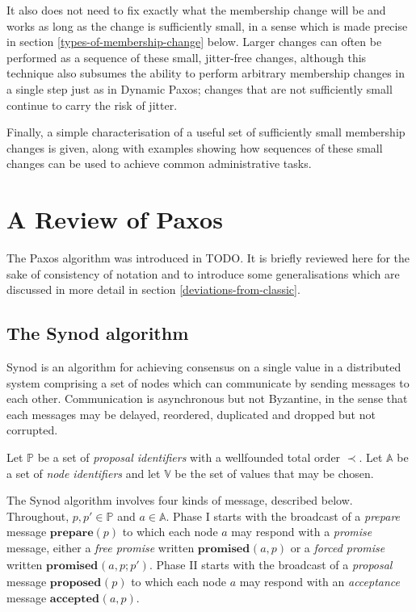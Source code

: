 \documentclass[journal]{IEEEtran}
\begin{document}
It also does not need to fix exactly what the membership change will be and
works as long as the change is sufficiently small, in a sense which is made
precise in section \ref{types-of-membership-change} below. Larger changes can
often be performed as a sequence of these small, jitter-free changes, although
this technique also subsumes the ability to perform arbitrary membership
changes in a single step just as in Dynamic Paxos; changes that are not
sufficiently small continue to carry the risk of jitter.

Finally, a simple characterisation of a useful set of sufficiently small
membership changes is given, along with examples showing how sequences of these
small changes can be used to achieve common administrative tasks.

\section{A Review of Paxos}

The Paxos algorithm was introduced in TODO. It is briefly reviewed here for the
sake of consistency of notation and to introduce some generalisations which are
discussed in more detail in section \ref{deviations-from-classic}.

\subsection{The Synod algorithm}

Synod is an algorithm for achieving consensus on a single value in a
distributed system comprising a set of nodes which can communicate by sending
messages to each other. Communication is asynchronous but not Byzantine, in the
sense that each messages may be delayed, reordered, duplicated and dropped but
not corrupted.

Let $\mathbb P$ be a set of \textit{proposal identifiers} with a wellfounded
total order $\prec$. Let $\mathbb A$ be a set of \textit{node identifiers} and
let $\mathbb V$ be the set of values that may be chosen.

\def\prep#1{\mathbf{prepare}(#1)}
\def\mprom#1#2#3{\mathbf{promised}_{\ge #1}(#2,#3)}
\def\fprom#1#2#3{\mathbf{promised}_{#1}(#2,#3)}
\def\bprom#1#2#3#4{\mathbf{promised}_{#1}(#2,#3;#4)}
\def\prop#1#2{\mathbf{proposed}_{#1}(#2)}
\def\acc#1#2#3{\mathbf{accepted}_{#1}(#2,#3)}
\def\chosen#1#2{\mathbf{chosen}_{#1}(#2)}
\def\owner#1{\mathrm{owner}(#1)}

The Synod algorithm involves four kinds of message, described below.
Throughout, $p, p' \in \mathbb P$ and $a \in \mathbb A$.  Phase I starts with
the broadcast of a \textit{prepare} message $\prep{p}$ to which each node $a$
may respond with a \textit{promise} message, either a \textit{free promise}
written $\fprom{}{a}{p}$ or a \textit{forced promise} written
$\bprom{}{a}{p}{p'}$.  Phase II starts with the broadcast of a
\textit{proposal} message $\prop{}{p}$ to which each node $a$ may respond with
an \textit{acceptance} message $\acc{}{a}{p}$.
\end{document}
